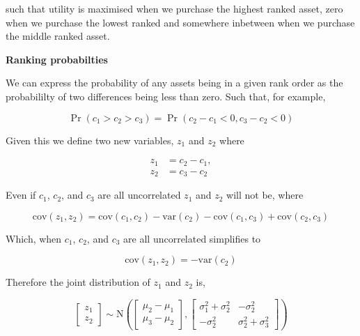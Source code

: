 \documentclass[]{article}
\theoremstyle{definition}
\theoremstyle{definition}
\theoremstyle{remark}
\begin{document}
such that utility is maximised when we purchase the highest ranked
asset, zero when we purchase the lowest ranked and somewhere inbetween
when we purchase the middle ranked asset.

\textbf{Ranking probabilties}

We can express the probability of any assets being in a given rank order
as the probabililty of two differences being less than zero. Such that,
for example,

\begin{equation}
\Pr(c_1 > c_2 > c_3) = \Pr(c_2 - c_1 < 0,  c_3 - c_2 < 0)
\label{eq:probrankapen}
\end{equation}

Given this we define two new variables, \(z_1\) and \(z_2\) where

\begin{equation}
\begin{aligned}
  z_1 &= c_2 - c_1,\\
  z_2 &= c_3 - c_2
\end{aligned}
\label{eq:z12apen}
\end{equation}

Even if \(c_1\), \(c_2\), and \(c_3\) are all uncorrelated \(z_1\) and
\(z_2\) will not be, where

\begin{equation}
\mathrm{cov}(z_1, z_2)=\mathrm{cov}(c_1, c_2) - \mathrm{var}(c_2) - \mathrm{cov}(c_1, c_3) + \mathrm{cov}(c_2, c_3)
\label{eq:covz}
\end{equation}

Which, when \(c_1\), \(c_2\), and \(c_3\) are all uncorrelated
simplifies to

\begin{equation}
\mathrm{cov}(z_1, z_2)=-\mathrm{var}(c_2)
\label{eq:covz2}
\end{equation}

Therefore the joint distribution of \(z_1\) and \(z_2\) is,

\begin{equation}
\begin{bmatrix}z_1\\z_2\end{bmatrix}
  \sim\mathrm{N}\left(
  \begin{bmatrix}\mu_2-\mu_1\\\mu_3-\mu_2\end{bmatrix},
  \begin{bmatrix}\sigma^2_1+\sigma^2_2&-\sigma^2_2\\-\sigma^2_2&\sigma^2_2+\sigma^2_3\end{bmatrix}\right)
\label{eq:jointzapen}
\end{equation}
\end{document}
